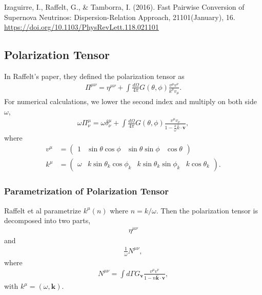\documentclass[letterpaper,12pt,english]{sphinxmanual}
\begin{document}
Izaguirre, I., Raffelt, G., \& Tamborra, I. (2016). Fast Pairwise Conversion of Supernova Neutrinos: Dispersion-Relation Approach, 21101(January), 1\textendash{}6. \url{https://doi.org/10.1103/PhysRevLett.118.021101}


\subsection{Polarization Tensor}
\label{\detokenize{collective/dispersion-relation:polarization-tensor}}
In Raffelt's paper, they defined the polarization tensor as
\begin{equation*}
\begin{split}\Pi^{\mu\nu} = \eta^{\mu\nu} + \int \frac{d\Omega}{4\pi} G(\theta,\phi) \frac{v^\mu v^\nu}{k^\mu v_\mu}.\end{split}
\end{equation*}
For numerical calculations, we lower the second index and multiply on both side \(\omega\),
\begin{equation*}
\begin{split}\omega\Pi^\mu_\nu = \omega\delta^\mu_\nu + \int \frac{d\Omega}{4\pi} G(\theta,\phi) \frac{v^\mu v_\nu}{ 1- \frac{k}{\omega} \hat k\cdot \mathbf v },\end{split}
\end{equation*}
where
\begin{equation*}
\begin{split}v^\mu &= \begin{pmatrix} 1 & \sin\theta \cos\phi & \sin\theta \sin\phi & \cos\theta \end{pmatrix}\\
k^\mu &= \begin{pmatrix} \omega & k \sin\theta_k \cos\phi_k & k\sin\theta_k \sin\phi_k & k\cos\theta_k \end{pmatrix}.\end{split}
\end{equation*}

\subsubsection{Parametrization of Polarization Tensor}
\label{\detokenize{collective/dispersion-relation:parametrization-of-polarization-tensor}}
Raffelt et al parametrize \(k^\mu(n)\) where \(n=k/\omega\). Then the polarization tensor is decomposed into two parts,
\begin{equation*}
\begin{split}\eta^{\mu\nu}\end{split}
\end{equation*}
and
\begin{equation*}
\begin{split}\frac{1}{\omega}N^{\mu\nu},\end{split}
\end{equation*}
where
\begin{equation*}
\begin{split}N^{\mu\nu} = \int d\Gamma G_{\mathbf v} \frac{v^\mu v^\nu}{ 1-n \hat{\mathbf k} \cdot \mathbf v },\end{split}
\end{equation*}
with \(k^\mu=(\omega,\mathbf k)\).
\end{document}
